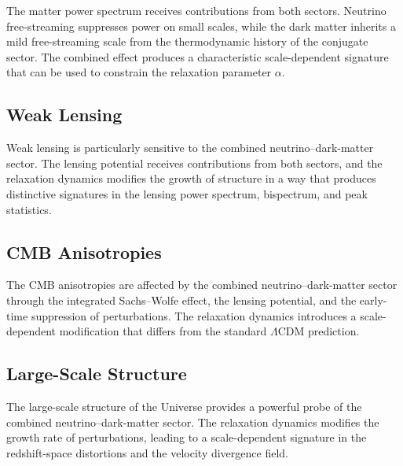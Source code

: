 \documentclass[11pt,a4paper]{article}
\newcommand{\alphaR}{\alpha}
\begin{document}
The matter power spectrum receives contributions from both sectors. Neutrino
free-streaming suppresses power on small scales, while the dark matter inherits
a mild free-streaming scale from the thermodynamic history of the conjugate
sector. The combined effect produces a characteristic scale-dependent signature
that can be used to constrain the relaxation parameter $\alphaR$.




\subsection{Weak Lensing}

Weak lensing is particularly sensitive to the combined neutrino–dark-matter
sector. The lensing potential receives contributions from both sectors, and the
relaxation dynamics modifies the growth of structure in a way that produces
distinctive signatures in the lensing power spectrum, bispectrum, and peak
statistics.




\subsection{CMB Anisotropies}

The CMB anisotropies are affected by the combined neutrino–dark-matter sector
through the integrated Sachs–Wolfe effect, the lensing potential, and the
early-time suppression of perturbations. The relaxation dynamics introduces a
scale-dependent modification that differs from the standard $\Lambda$CDM
prediction.




\subsection{Large-Scale Structure}

The large-scale structure of the Universe provides a powerful probe of the
combined neutrino–dark-matter sector. The relaxation dynamics modifies the
growth rate of perturbations, leading to a scale-dependent signature in the
redshift-space distortions and the velocity divergence field.
\end{document}
